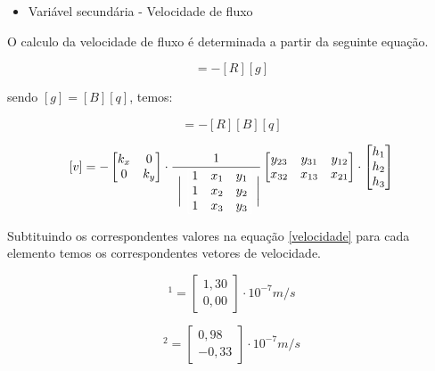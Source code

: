 \documentclass{article} %
\begin{document}
\begin{itemize}
	\item Variável secundária - Velocidade de fluxo
\end{itemize}


O calculo da velocidade de fluxo é determinada a partir da seguinte equação.

\begin{equation}
[v]=-[R][g]
\end{equation}

sendo \([g]=[B][q]\), temos:

\begin{equation}
[v]=-[R][B][q]
\end{equation}

\begin{equation}\label{velocidade}
[v]=-\begin{bmatrix}
k_x&0\\
0&k_y
\end{bmatrix}\cdot\frac{1}{\hspace{4pt}\biggr|\color{white}\begin{bmatrix}\color{black}
	1&\color{black}x_1&\color{black}y_1\\\color{black}1&\color{black}x_2&\color{black}y_2\\\color{black}1&\color{black}x_3&\color{black}y_3
	\color{white}\end{bmatrix}\color{black}\biggr|}\begin{bmatrix}
y_{23}&y_{31}&y_{12}\\x_{32}&x_{13}&x_{21}
\end{bmatrix}\cdot \begin{bmatrix}
h_1\\
h_2\\
h_3
\end{bmatrix}
\end{equation}

 Subtituindo os correspondentes valores na equação \ref{velocidade} para cada elemento temos os correspondentes vetores de velocidade.
 
 
 \begin{equation}
 [v]^{1}=\begin{bmatrix}
1,30\\
0,00
 \end{bmatrix}\cdot 10^{-7}m/s
 \end{equation}
 
 \begin{equation}
[v]^{2}=\begin{bmatrix}
0,98\\
-0,33
\end{bmatrix}\cdot 10^{-7}m/s
\end{equation}
\end{document}
